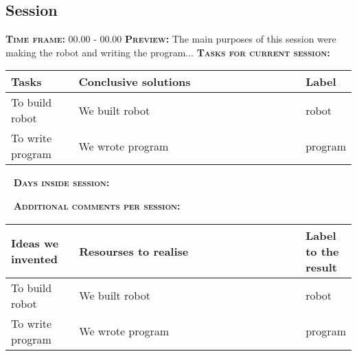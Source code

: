\subsection{Session}
	\textsc{\textbf{Time frame:}} 00.00 - 00.00 \newline
	\textsc{\textbf{Preview:}} The main purposes of this session were making the robot and writing the program...\newline \newline
	\textsc{\textbf{Tasks for current session:}}

  \begin{table}[H]
	\vspace{-2mm}
	\begin{center}
		\begin{tabular}{|p{0.2\linewidth}|p{0.7\linewidth}|p{0.1\linewidth}|}
			\hline
			Tasks & Conclusive solutions & Label \\
			\hline
			To build robot & We built robot & robot \\
			\hline
			To write program & We wrote program & program \\
			\hline
		\end{tabular}
	\end{center}
  \end{table}
  
   \newline
  \textsc{\textbf{Days inside session:}}
  
  
  
   \newline
  \textsc{\textbf{Additional comments per session:}}
  
  \begin{table}[H]
  	\vspace{-2mm}
  	\begin{center}
  		\begin{tabular}{|p{0.2\linewidth}|p{0.7\linewidth}|p{0.1\linewidth}|}
  			\hline
  			Ideas we invented & Resourses to realise & Label to the result \\
  			\hline
  			To build robot & We built robot & robot \\
  			\hline
  			To write program & We wrote program & program \\
  			\hline
  		\end{tabular}
  	\end{center}
  \end{table}
  
\fillpage
